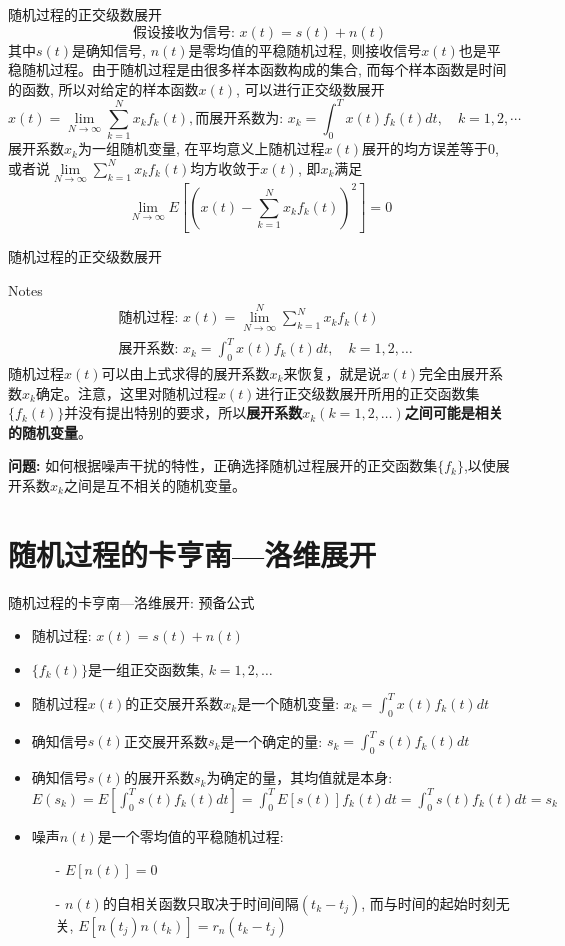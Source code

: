 \begin{frame}[shrink]{随机过程的正交级数展开}
\[\text{假设接收为信号: } x(t)=s(t)+n(t)\]
其中$s(t)$是确知信号, $n(t)$是零均值的平稳随机过程, 则接收信号$x(t)$也是平稳随机过程。由于随机过程是由很多样本函数构成的集合, 而每个样本函数是时间的函数, 所以对给定的样本函数$x(t)$, 可以进行正交级数展开
\[x(t)=\lim\limits_{N\to\infty}\sum_{k=1}^{N}x_kf_k(t), \text{而展开系数为: }x_k=\int_{0}^{T}x(t)f_k(t)dt,\quad k=1,2,\cdots \]
展开系数$x_k$为一组随机变量, 在平均意义上随机过程$x(t)$展开的均方误差等于0,或者说$\lim\limits_{N\to\infty}\sum\limits_{k=1}^{N}x_kf_k(t)$均方收敛于$x(t)$, 即$x_k$满足
\[\lim\limits_{N\to\infty}E\left[\left(x(t)-\sum_{k=1}^{N}x_kf_k(t)\right)^2 \right]=0 \]
\end{frame}

\begin{frame}{随机过程的正交级数展开}
\begin{block}{Notes}
\begin{align*}
&\text{随机过程: } x(t)=\lim\limits_{N\to\infty}^N\sum\limits_{k=1}^Nx_kf_k(t)\\
&\text{展开系数: } x_k=\int_{0}^{T}x(t)f_k(t)dt,\quad k=1,2,\dots
\end{align*}
随机过程$x(t)$可以由上式求得的展开系数$x_k$来恢复，就是说$x(t)$完全由展开系数$x_k$确定。注意，这里对随机过程$x(t)$进行正交级数展开所用的正交函数集$\{f_k(t)\}$并没有提出特别的要求，所以\textbf{展开系数$x_k(k=1,2,\dots)$之间可能是相关的随机变量}。\\
\end{block}
\textbf{问题:} 如何根据噪声干扰的特性，正确选择随机过程展开的正交函数集$\{f_k\}$,以使展开系数$x_k$之间是互不相关的随机变量。
\end{frame}

\section{随机过程的卡亨南---洛维展开}

\begin{frame}{随机过程的卡亨南---洛维展开: 预备公式}
\begin{itemize}
\item 随机过程: $x(t)=s(t)+n(t)$
\item $\{f_k(t)\}$是一组正交函数集, $k=1,2,\dots$
\item 随机过程$x(t)的$正交展开系数$x_k$是一个随机变量: $x_k=\int_{0}^{T}x(t)f_k(t)dt$
\item 确知信号$s(t)$正交展开系数$s_k$是一个确定的量: $s_k=\int_{0}^{T}s(t)f_k(t)dt$
\item 确知信号$s(t)$的展开系数$s_k$为确定的量，其均值就是本身: $E(s_k)=E\left[\int_{0}^{T}s(t)f_k(t)dt\right]=\int_{0}^{T}E[s(t)]f_k(t)dt=\int_{0}^{T}s(t)f_k(t)dt=s_k$
\item 噪声$n(t)$是一个零均值的平稳随机过程:
\begin{itemize}
\item[-] $E[n(t)]=0$
\item[-]  $n(t)$的自相关函数只取决于时间间隔$(t_k-t_j)$, 而与时间的起始时刻无关, $E[n(t_j)n(t_k)]=r_n(t_k-t_j)$
\end{itemize}
\end{itemize}
\end{frame}

